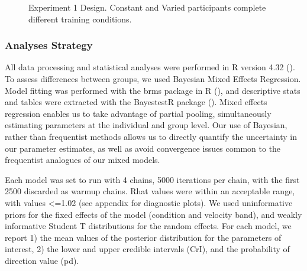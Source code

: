 \documentclass[
  11pt,
  letterpaper,
]{article}
\begin{document}
\begin{figure}


\caption{\label{fig-design-e1}Experiment 1 Design. Constant and Varied
participants complete different training conditions.}

\end{figure}%

\subsubsection{Analyses Strategy}\label{analyses-strategy}

All data processing and statistical analyses were performed in R version
4.32 (). To assess differences between groups, we used Bayesian Mixed
Effects Regression. Model fitting was performed with the brms package in
R (), and
descriptive stats and tables were extracted with the BayestestR package
(). Mixed effects regression enables us to take advantage of partial
pooling, simultaneously estimating parameters at the individual and
group level. Our use of Bayesian, rather than frequentist methods allows
us to directly quantify the uncertainty in our parameter estimates, as
well as avoid convergence issues common to the frequentist analogues of
our mixed models.

Each model was set to run with 4 chains, 5000 iterations per chain, with
the first 2500 discarded as warmup chains. Rhat values were within an
acceptable range, with values \textless=1.02 (see appendix for
diagnostic plots). We used uninformative priors for the fixed effects of
the model (condition and velocity band), and weakly informative Student
T distributions for the random effects. For each model, we report 1) the
mean values of the posterior distribution for the parameters of
interest, 2) the lower and upper credible intervals (CrI), and the
probability of direction value (pd).
\end{document}
